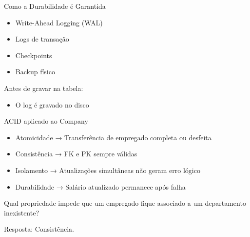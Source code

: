 \documentclass{beamer}
\begin{document}
\begin{frame}{Como a Durabilidade é Garantida}

\begin{itemize}
    \item Write-Ahead Logging (WAL)
    \item Logs de transação
    \item Checkpoints
    \item Backup físico
\end{itemize}

Antes de gravar na tabela:
\begin{itemize}
    \item O log é gravado no disco
\end{itemize}

\end{frame}







\begin{frame}{ACID aplicado ao Company}

\begin{itemize}
    \item Atomicidade → Transferência de empregado completa ou desfeita
    \item Consistência → FK e PK sempre válidas
    \item Isolamento → Atualizações simultâneas não geram erro lógico
    \item Durabilidade → Salário atualizado permanece após falha
\end{itemize}

Qual propriedade impede que um empregado fique associado a um departamento inexistente?

Resposta: Consistência.

\end{frame}
\end{document}
